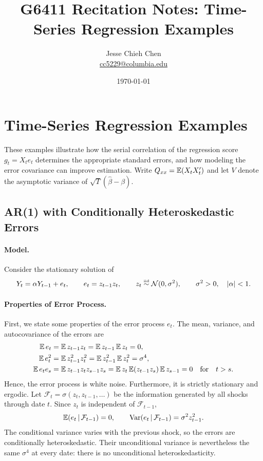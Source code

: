 \documentclass[a4paper,12pt]{article}
\title{G6411 Recitation Notes: Time-Series Regression Examples}
\author{Jesse Chieh Chen\\\href{mailto:cc5229@columbia.edu}{cc5229@columbia.edu}}
\date{\today}
\begin{document}
\appendix
\section{Time-Series Regression Examples}

These examples illustrate how the serial correlation of the regression score
$g_t=X_te_t$ determines the appropriate standard errors,
and how modeling the error covariance can improve estimation.
Write $Q_{xx}=\operatorname{\mathbb{E}}(X_tX_t^{\prime})$ and let $V$ denote the asymptotic variance of
$\sqrt T(\widehat\beta-\beta)$.

\subsection{AR(1) with Conditionally Heteroskedastic Errors}

\paragraph{Model.}
Consider the stationary solution of
\begin{align}
	Y_t=\alpha Y_{t-1}+ e_t,\qquad
	 e_t=z_{t-1}z_t,\qquad
	z_t\overset{\text{\tiny iid}}{\sim}\operatorname{\mathcal{N}}(0,\sigma^2),\qquad \sigma^2>0,\quad |\alpha|<1.
\end{align}

\paragraph{Properties of Error Process.}
First, we state some properties of the error process $e_t$.
The mean, variance, and autocovariance of the errors are
\begin{align}
	\operatorname{\mathbb{E}} e_t &= \operatorname{\mathbb{E}} z_{t-1} z_t = \operatorname{\mathbb{E}} z_{t-1}\operatorname{\mathbb{E}} z_t = 0, \\
	\operatorname{\mathbb{E}} e_t^2 &= \operatorname{\mathbb{E}} z_{t-1}^2 z_t^2 = \operatorname{\mathbb{E}} z_{t-1}^2 \operatorname{\mathbb{E}} z_t^2 = \sigma^4, \\
	\operatorname{\mathbb{E}} e_t e_{s} &= \operatorname{\mathbb{E}} z_{t-1} z_t z_{s-1} z_s = \operatorname{\mathbb{E}} z_{t} \operatorname{\mathbb{E}}(z_{t-1} z_{s}) \operatorname{\mathbb{E}} z_{s-1} = 0 \quad\text{for}\quad t > s.
\end{align}
Hence, the error process is white noise.
Furthermore, it is strictly stationary and ergodic.
Let $\mathcal F_t=\sigma(z_t,z_{t-1},\ldots)$ be the information generated by all shocks through date $t$.
Since $z_t$ is independent of $\mathcal F_{t-1}$,
\begin{align}
	\operatorname{\mathbb{E}}(e_t\mathpunct{}|\mathpunct{}\mathcal F_{t-1})=0,
	\qquad \operatorname{\text{\textrm{\upshape{Var}}}}(e_t\mathpunct{}|\mathpunct{}\mathcal F_{t-1})=\sigma^2z_{t-1}^2.
\end{align}
The conditional variance varies with the previous shock, so the errors are conditionally heteroskedastic.
Their unconditional variance is nevertheless the same $\sigma^4$ at every date:
there is no unconditional heteroskedasticity.
\end{document}
